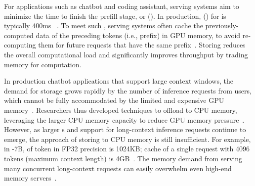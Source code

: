 For applications such as chatbot and coding assistant, \llm serving systems aim to minimize the time to finish the prefill stage, or \ttftfull (\ttft).
In production, \slofull (\slo) for \ttft is typically 400ms ~\cite{distserve}.
To meet such \slo, \llm serving systems often cache the previously-computed \kv data of the preceding tokens (i.e., prefix) in GPU memory, to avoid re-computing them for future requests that have the same prefix~\cite{pagedattenion, distserve, memserve}. 
Storing \kvcache reduces the overall computational load and significantly improves throughput by trading memory for computation. 


In production chatbot applications that support large context windows, the demand for \kvcache storage grows rapidly by the number of inference requests from users, which cannot be fully accommodated  by the limited and expensive GPU memory~\cite{miao2023towards}.
Researchers thus developed techniques to offload \kvcache to CPU memory, leveraging the larger CPU memory capacity to reduce GPU memory pressure~\cite{memserve, cacheblend,sheng2023flexgen}. 
However, as larger \llm{}s and support for long-context inference requests continue to emerge, the approach of storing \kvcache to CPU memory is still insufficient. 
For example, in -7B, \kvcache of token in FP32 precision is 1024KB; \kv cache of a single request with 4096 tokens (maximum context length) is 4GB~\cite{llama2}.
The memory demand from serving many concurrent long-context requests can easily overwhelm even high-end memory servers~\cite{pagedattenion,liu2023cachegen}. 

